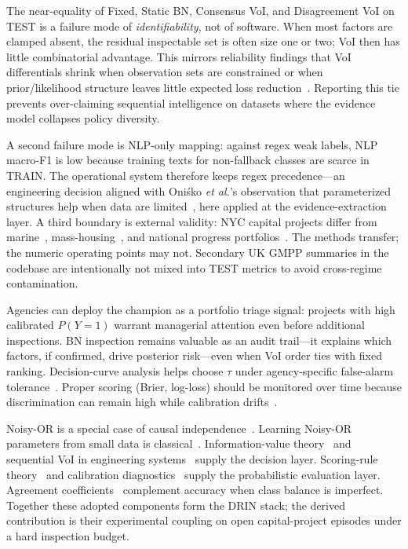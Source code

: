The near-equality of Fixed, Static BN, Consensus VoI, and Disagreement VoI on TEST is a failure mode of \emph{identifiability}, not of software. When most factors are clamped absent, the residual inspectable set is often size one or two; VoI then has little combinatorial advantage. This mirrors reliability findings that VoI differentials shrink when observation sets are constrained or when prior/likelihood structure leaves little expected loss reduction~\cite{Song2021,Memarzadeh2016,Malings2016}. Reporting this tie prevents over-claiming sequential intelligence on datasets where the evidence model collapses policy diversity.

A second failure mode is NLP-only mapping: against regex weak labels, NLP macro-F1 is low because training texts for non-fallback classes are scarce in TRAIN. The operational system therefore keeps regex precedence---an engineering decision aligned with Oni\'sko \textit{et al.}'s observation that parameterized structures help when data are limited~\cite{Onisko2001}, here applied at the evidence-extraction layer. A third boundary is external validity: NYC capital projects differ from marine~\cite{Comu2023}, mass-housing~\cite{Khodabakhshian2025}, and national progress portfolios~\cite{Tagharobi2025}. The methods transfer; the numeric operating points may not. Secondary UK GMPP summaries in the codebase are intentionally not mixed into TEST metrics to avoid cross-regime contamination.

Agencies can deploy the champion as a portfolio triage signal: projects with high calibrated $P(Y{=}1)$ warrant managerial attention even before additional inspections. BN inspection remains valuable as an audit trail---it explains which factors, if confirmed, drive posterior risk---even when VoI order ties with fixed ranking. Decision-curve analysis helps choose $\tau$ under agency-specific false-alarm tolerance~\cite{Vickers2006}. Proper scoring (Brier, log-loss) should be monitored over time because discrimination can remain high while calibration drifts~\cite{Gneiting2007,GneitingRaftery2007}.

Noisy-OR is a special case of causal independence~\cite{Heckerman1996}. Learning Noisy-OR parameters from small data is classical~\cite{Onisko2001}. Information-value theory~\cite{Howard1966} and sequential VoI in engineering systems~\cite{Memarzadeh2016,Fauriat2020,Yuan2021,Song2021} supply the decision layer. Scoring-rule theory~\cite{Brier1950,Murphy1973,GneitingRaftery2007} and calibration diagnostics~\cite{Gneiting2007} supply the probabilistic evaluation layer. Agreement coefficients~\cite{Cohen1960} complement accuracy when class balance is imperfect. Together these adopted components form the DRIN stack; the derived contribution is their experimental coupling on open capital-project episodes under a hard inspection budget.
